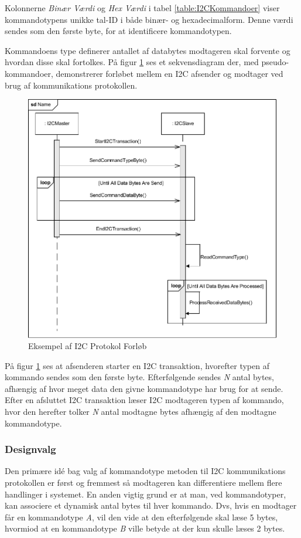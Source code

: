 Kolonnerne \textit{Binær Værdi} og \textit{Hex Værdi} i tabel \ref{table:I2CKommandoer} viser kommandotypens unikke tal-ID i både binær- og hexadecimalform. Denne værdi sendes som den første byte, for at identificere kommandotypen.

Kommandoens type definerer antallet af databytes modtageren skal forvente og hvordan disse skal fortolkes. På figur \ref{fig:I2CProtokolEksempel} ses et sekvensdiagram der, med pseudo-kommandoer, demonstrerer forløbet mellem en I2C afsender og modtager ved brug af kommunikations protokollen.

\begin{figure}[H]
	\centering
	\includegraphics[width=\textwidth] {Systemarkitektur/images/I2CProtocol}
	\caption{Eksempel af I2C Protokol Forløb}
	\label{fig:I2CProtokolEksempel}
\end{figure}

På figur \ref{fig:I2CProtokolEksempel} ses at afsenderen starter en I2C transaktion, hvorefter typen af kommando sendes som den første byte. Efterfølgende sendes \textit{N} antal bytes, afhængig af hvor meget data den givne kommandotype har brug for at sende. Efter en afsluttet I2C transaktion læser I2C modtageren typen af kommando, hvor den herefter tolker \textit{N} antal modtagne bytes afhængig af den modtagne kommandotype.

\subsubsection{Designvalg}
Den primære idé bag valg af kommandotype metoden til I2C kommunikations protokollen er først og fremmest så modtageren kan differentiere mellem flere handlinger i systemet. En anden vigtig grund er at man, ved kommandotyper, kan associere et dynamisk antal bytes til hver kommando. Dvs, hvis en modtager får en kommandotype \textit{A}, vil den vide at den efterfølgende skal læse 5 bytes, hvormiod at en kommandotype \textit{B} ville betyde at der kun skulle læses 2 bytes.


